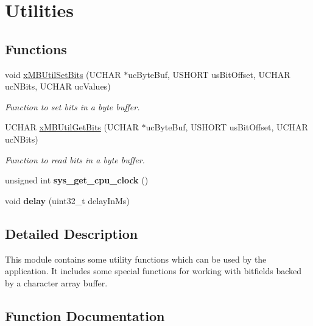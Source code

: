 \hypertarget{group__modbus__utils}{}\section{Utilities}
\label{group__modbus__utils}
\subsection*{Functions}
\begin{DoxyCompactItemize}
\item 
void \hyperlink{group__modbus__utils_gaffd1defb8bceb85f1b65d64fa1c895e1}{x\+M\+B\+Util\+Set\+Bits} (U\+C\+H\+AR $\ast$uc\+Byte\+Buf, U\+S\+H\+O\+RT us\+Bit\+Offset, U\+C\+H\+AR uc\+N\+Bits, U\+C\+H\+AR uc\+Values)
\begin{DoxyCompactList}\small\item\em Function to set bits in a byte buffer. \end{DoxyCompactList}\item 
U\+C\+H\+AR \hyperlink{group__modbus__utils_ga94b3b43e1d2353e621748c79e2fb4dd5}{x\+M\+B\+Util\+Get\+Bits} (U\+C\+H\+AR $\ast$uc\+Byte\+Buf, U\+S\+H\+O\+RT us\+Bit\+Offset, U\+C\+H\+AR uc\+N\+Bits)
\begin{DoxyCompactList}\small\item\em Function to read bits in a byte buffer. \end{DoxyCompactList}\item 
unsigned int {\bfseries sys\+\_\+get\+\_\+cpu\+\_\+clock} ()\hypertarget{group__modbus__utils_ga6ac4b492b79ce75125ae13fd7715873b}{}\label{group__modbus__utils_ga6ac4b492b79ce75125ae13fd7715873b}

\item 
void {\bfseries delay} (uint32\+\_\+t delay\+In\+Ms)\hypertarget{group__modbus__utils_ga5e9309bb72bdc5ba7967fd40ae3ca91a}{}\label{group__modbus__utils_ga5e9309bb72bdc5ba7967fd40ae3ca91a}

\end{DoxyCompactItemize}


\subsection{Detailed Description}
This module contains some utility functions which can be used by the application. It includes some special functions for working with bitfields backed by a character array buffer. 

\subsection{Function Documentation}
